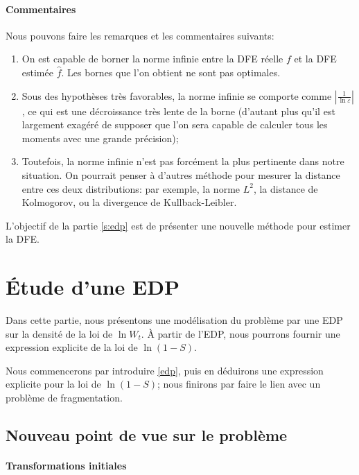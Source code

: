 \documentclass[12pt]{article}
\newcommand{\abs}[1]{\left|#1\right|}
\begin{document}
\paragraph{Commentaires}

Nous pouvons faire les remarques et les commentaires suivants:
\begin{enumerate}
\item On est capable de borner la norme infinie entre la DFE réelle $f$ et la DFE estimée $\hat{f}$. Les bornes que l'on obtient ne sont pas optimales.
\item Sous des hypothèses très favorables, la norme infinie se comporte comme $\abs{\frac{1}{\ln\varepsilon}}$, ce qui est une décroissance très lente de la borne (d'autant plus qu'il est largement exagéré de supposer que l'on sera capable de calculer tous les moments avec une grande précision);
\item Toutefois, la norme infinie n'est pas forcément la plus pertinente dans notre situation. On pourrait penser à d'autres méthode pour mesurer la distance entre ces deux distributions: par exemple, la norme $L^2$, la distance de Kolmogorov, ou la divergence de Kullback-Leibler.
\end{enumerate}

L'objectif de la partie \ref{s:edp} est de présenter une nouvelle méthode pour estimer la DFE.


\FloatBarrier
\section{Étude d'une EDP\label{s:edp}}

Dans cette partie, nous présentons une modélisation du problème par une EDP sur la densité de la loi de $\ln W_t$. À partir de l'EDP, nous pourrons fournir une expression explicite de la loi de $\ln (1-S)$.

Nous commencerons par introduire \eqref{edp}, puis en déduirons une expression explicite pour la loi de $\ln(1-S)$; nous finirons par faire le lien avec un problème de fragmentation.

\subsection{Nouveau point de vue sur le problème}

\paragraph{Transformations initiales}
\end{document}
